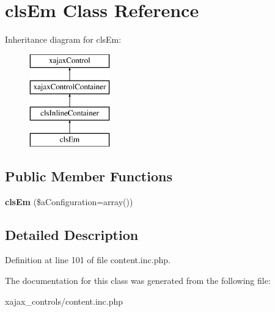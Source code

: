 \hypertarget{classclsEm}{
\section{clsEm Class Reference}
\label{classclsEm}
}
Inheritance diagram for clsEm:\begin{figure}[H]
\begin{center}
\leavevmode
\includegraphics[height=4.000000cm]{classclsEm}
\end{center}
\end{figure}
\subsection*{Public Member Functions}
\begin{DoxyCompactItemize}
\item 
\hypertarget{classclsEm_abf003a775bb7cf01a6b2fbb480e5291f}{
{\bfseries clsEm} (\$aConfiguration=array())}
\label{classclsEm_abf003a775bb7cf01a6b2fbb480e5291f}

\end{DoxyCompactItemize}


\subsection{Detailed Description}


Definition at line 101 of file content.inc.php.



The documentation for this class was generated from the following file:\begin{DoxyCompactItemize}
\item 
xajax\_\-controls/content.inc.php\end{DoxyCompactItemize}
